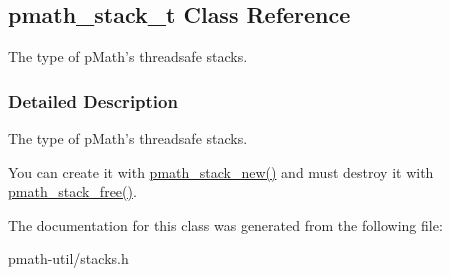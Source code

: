 \hypertarget{classpmath__stack__t}{
\subsection{pmath\_\-stack\_\-t Class Reference}
\label{classpmath__stack__t}
}
The type of pMath's threadsafe stacks.  




\subsubsection{Detailed Description}
The type of pMath's threadsafe stacks. 

You can create it with \hyperlink{group__stacks_g4a549111f394261de5ac3cc3acda428b}{pmath\_\-stack\_\-new()} and must destroy it with \hyperlink{group__stacks_gc681555957545245455f2a0ac97e3828}{pmath\_\-stack\_\-free()}. 

The documentation for this class was generated from the following file:\begin{CompactItemize}
\item 
pmath-util/stacks.h\end{CompactItemize}
